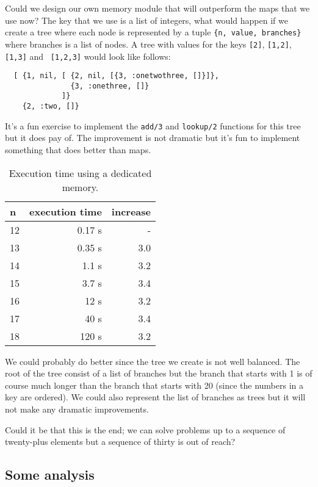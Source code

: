 \documentclass[a4paper,11pt]{article}
\begin{document}
Could we design our own memory module that will outperform the maps
that we use now? The key that we use is a list of integers, what would
happen if we create a tree where each node is represented by a tuple
{\tt \{n, value, branches\}} where branches is a list of nodes. A tree
with values for the keys {\tt [2]}, {\tt [1,2]}, {\tt [1,3]} and {\tt
[1,2,3]} would look like follows:

\begin{verbatim}
  [ {1, nil, [ {2, nil, [{3, :onetwothree, []}]},
               {3, :onethree, []}
             ]}
    {2, :two, []}
\end{verbatim}

It's a fun exercise to implement the {\tt add/3} and {\tt lookup/2}
functions for this tree but it does pay of. The improvement is not
dramatic but it's fun to implement something that does better than
maps.

\begin{table}[h!]
  \begin{center}
    \begin{tabular}{l|r|r}
      \textbf{n} & \textbf{execution time} & \textbf{increase}\\
      \hline
      12	 &0.17 s & -\\ 
      13	 &0.35 s &3.0 \\ 
      14	 &1.1 s &3.2 \\ 
      15	 &3.7 s &3.4 \\ 
      16	 &12 s &3.2 \\ 
      17	 &40 s &3.4 \\ 
      18	 &120 s&3.2 \\ 
    \end{tabular}
    \caption{Execution time using a dedicated memory.}
  \end{center}
\end{table}

We could probably do better since the tree we create is not well
balanced. The root of the tree consist of a list of branches but the
branch that starts with 1 is of course much longer than the branch
that starts with 20 (since the numbers in a key are ordered). We could
also represent the list of branches as trees  but it will not
make any dramatic improvements.

Could it be that this is the end; we can solve problems up to a
sequence of twenty-plus elements but a sequence of thirty is out of
reach? 

\subsection*{Some analysis}
\end{document}
